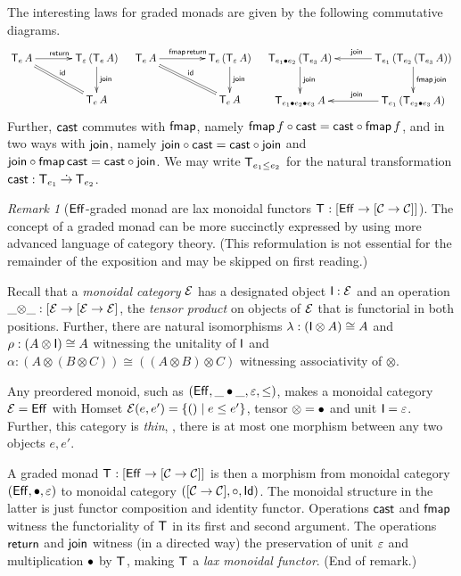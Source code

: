 \documentclass[acmsmall,review,anonymous]{acmart}\settopmatter{printfolios=true,printccs=false,printacmref=false}
\theoremstyle{remark}
\newtheorem{remark}{Remark}
\begin{document}
The interesting laws for graded monads are given by the following
commutative diagrams.
\[
\xymatrix@C=8ex{
  \T[e]\,A     \ar[r]^{\treturn} \ar@{=}[dr]^{\tid}
& \T[\Ge]\,(\T[e]\,A) \ar[d]^{\tjoin}
\\
& \T[e]\,A
}
\quad
\xymatrix@C=10ex{
  \T[e]\,A     \ar[r]^{\tfmap\,\treturn} \ar@{=}[dr]^{\tid}
& \T[e]\,(\T[\Ge]\,A) \ar[d]^{\tjoin}
\\
& \T[e]\,A
}
\quad
\xymatrix@C=8ex{
  \T[e_1 \bu e_2]\,(\T[e_3]\,A) \ar[d]^{\tjoin}
& \T[e_1]\,(\T[e_2]\,(\T[e_3]\,A)) \ar[l]_{\tjoin} \ar[d]^{\tfmap\,\tjoin}
\\
  \T[e_1 \bu e_2 \bu e_3]\,A
& \T[e_1]\,(\T[e_2 \bu e_3]\,A) \ar[l]_{\tjoin}
}
\]
Further, $\tcast$ commutes with $\tfmap$, namely $\tfmap\,f \circ
\tcast = \tcast \circ \tfmap\,f$, and in two ways with $\tjoin$, namely
$\tjoin \circ \tcast = \tcast \circ \tjoin$ and $\tjoin
\circ \tfmap\,\tcast = \tcast \circ \tjoin$.
We may write $\T[e_1 \leq e_2]$ for the natural transformation
$\tcast : \T[e_1] \todot \T[e_2]$.

\begin{remark}[$\Eff$-graded monad are lax monoidal functors $\T : {[\Eff \to [\CC \to \CC]]}$]
The concept of a graded monad can be more succinctly expressed by
using more advanced language of category theory.  (This reformulation
is not essential for the remainder of the exposition and may be
skipped on first reading.)

Recall that a \emph{monoidal category} $\EE$ has a designated object
$\I : \EE$ and an operation $\_{\otimes}\_ : [\EE \to [\EE \to \EE]$,
the \emph{tensor product} on objects of $\EE$ that is functorial in
both positions.  Further, there are natural isomorphisms
$\Gl : (\I \otimes A) \cong A$ and $\Gr : (A \otimes \I) \cong A$
witnessing the unitality of $\I$ and
$\alpha : (A \otimes (B \otimes C)) \cong ((A \otimes B) \otimes C)$
witnessing associativity of $\otimes$.

Any preordered monoid, such as $(\Eff,\_\bu\_,\Ge,\leq)$, makes a
monoidal category $\EE = \Eff$ with Homset
$\EE(e,e') = \{ () \mid e \leq e' \}$, tensor $\otimes = \bu$ and unit
$\I = \Ge$.  Further, this category is \emph{thin}, \ie, there is at
most one morphism between any two objects $e,e'$.

A graded monad $\T : [\Eff \to [\CC \to \CC]]$ is then a morphism from
monoidal category $(\Eff,\bu,\Ge)$ to monoidal category
$([\CC \to \CC],\comp,\Id)$.  The monoidal structure in the latter is
just functor composition and identity functor.  Operations $\tcast$
and $\tfmap$ witness the functoriality of $\T$ in its first and second
argument.  The operations $\treturn$ and $\tjoin$ witness (in a
directed way) the preservation of unit $\Ge$ and multiplication $\bu$
by $\T$, making $\T$ a \emph{lax monoidal functor}.
(End of remark.)
\end{remark}
\end{document}
